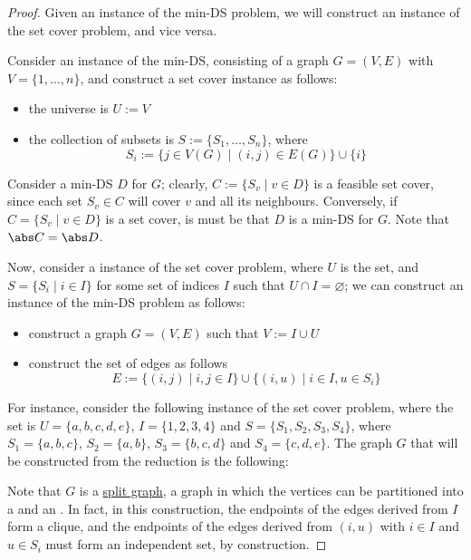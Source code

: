 \documentclass[a4paper, 12pt]{report}
\begin{document}
    \begin{proof}
        Given an instance of the min-DS problem, we will construct an instance of the set cover problem, and vice versa.

        Consider an instance of the min-DS, consisting of a graph $G = (V, E)$ with $V = \{1, \ldots, n \}$, and construct a set cover instance as follows:

        \begin{itemize}
            \item the universe is $U := V$
            \item the collection of subsets is $S := \{S_1, \ldots, S_n\}$, where $$S_i := \{j \in V(G) \mid (i,j) \in E(G)\} \cup \{i\}$$
        \end{itemize}

        Consider a min-DS $D$ for $G$; clearly, $C := \{S_v \mid v \in D\}$ is a feasible set cover, since each set $S_v \in C$ will cover $v$ and all its neighbours. Conversely, if $C = \{S_v \mid v \in D\}$ is a set cover, is must be that $D$ is a min-DS for $G$. Note that $\abs C = \abs D$.

        Now, consider a instance of the set cover problem, where $U$ is the  set, and $S = \{S_i \mid i \in I\}$ for some set of indices $I$ such that $U \cap I = \varnothing$; we can construct an instance of the min-DS problem as follows:

        \begin{itemize}
            \item construct a graph $G = (V, E)$ such that $V := I \cup U$
            \item construct the set of edges as follows $$E := \{(i, j) \mid i, j \in I\} \cup \{(i, u) \mid i \in I, u \in S_i\}$$
        \end{itemize}

        For instance, consider the following instance of the set cover problem, where the  set is $U = \{a, b, c, d, e\}$, $I = \{1, 2, 3, 4\}$ and $S = \{S_1, S_2, S_3, S_4\}$, where $S_1 = \{a, b, c\}$, $S_2 =\{a, b\}$, $S_3 = \{b, c, d\}$ and $S_4 = \{c, d, e\}$. The graph $G$ that will be constructed from the reduction is the following: 

        Note that $G$ is a \href{https://en.wikipedia.org/wiki/Split_graph}{split graph}, a graph in which the vertices can be partitioned into a  and an . In fact, in this construction, the endpoints of the edges derived from $I$ form a clique, and the endpoints of the edges derived from $(i, u)$ with $i \in I$ and $u \in S_i$ must form an independent set, by construction.


\end{proof}
\end{document}
